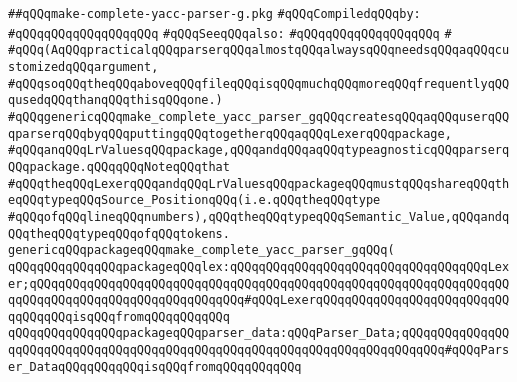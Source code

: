 \label{src/app/yacc/lib/make-complete-yacc-parser-g.pkg}
\verb|##qQQqmake-complete-yacc-parser-g.pkg|\newline
\newline
\verb|#qQQqCompiledqQQqby:|\newline
\verb|#qQQqqQQqqQQqqQQqqQQq|\newline
\newline
\verb|#qQQqSeeqQQqalso:|\newline
\verb|#qQQqqQQqqQQqqQQqqQQq|\newline
\verb|#|\newline
\verb|#qQQq(AqQQqpracticalqQQqparserqQQqalmostqQQqalwaysqQQqneedsqQQqaqQQqcustomizedqQQqargument,|\newline
\verb|#qQQqsoqQQqtheqQQqaboveqQQqfileqQQqisqQQqmuchqQQqmoreqQQqfrequentlyqQQqusedqQQqthanqQQqthisqQQqone.)|\newline
\newline
\verb|#qQQqgenericqQQqmake_complete_yacc_parser_gqQQqcreatesqQQqaqQQquserqQQqparserqQQqbyqQQqputtingqQQqtogetherqQQqaqQQqLexerqQQqpackage,|\newline
\verb|#qQQqanqQQqLrValuesqQQqpackage,qQQqandqQQqaqQQqtypeagnosticqQQqparserqQQqpackage.qQQqqQQqNoteqQQqthat|\newline
\verb|#qQQqtheqQQqLexerqQQqandqQQqLrValuesqQQqpackageqQQqmustqQQqshareqQQqtheqQQqtypeqQQqSource_PositionqQQq(i.e.qQQqtheqQQqtype|\newline
\verb|#qQQqofqQQqlineqQQqnumbers),qQQqtheqQQqtypeqQQqSemantic_Value,qQQqandqQQqtheqQQqtypeqQQqofqQQqtokens.|\newline
\newline
\newline
\newline
\verb|genericqQQqpackageqQQqmake_complete_yacc_parser_gqQQq(|\newline
\newline
\verb|qQQqqQQqqQQqqQQqpackageqQQqlex:qQQqqQQqqQQqqQQqqQQqqQQqqQQqqQQqqQQqLexer;qQQqqQQqqQQqqQQqqQQqqQQqqQQqqQQqqQQqqQQqqQQqqQQqqQQqqQQqqQQqqQQqqQQqqQQqqQQqqQQqqQQqqQQqqQQqqQQqqQQq#qQQqLexerqQQqqQQqqQQqqQQqqQQqqQQqqQQqqQQqqQQqisqQQqfromqQQqqQQqqQQq|\newline
\verb|qQQqqQQqqQQqqQQqpackageqQQqparser_data:qQQqParser_Data;qQQqqQQqqQQqqQQqqQQqqQQqqQQqqQQqqQQqqQQqqQQqqQQqqQQqqQQqqQQqqQQqqQQqqQQqqQQq#qQQqParser_DataqQQqqQQqqQQqisqQQqfromqQQqqQQqqQQq|\newline

